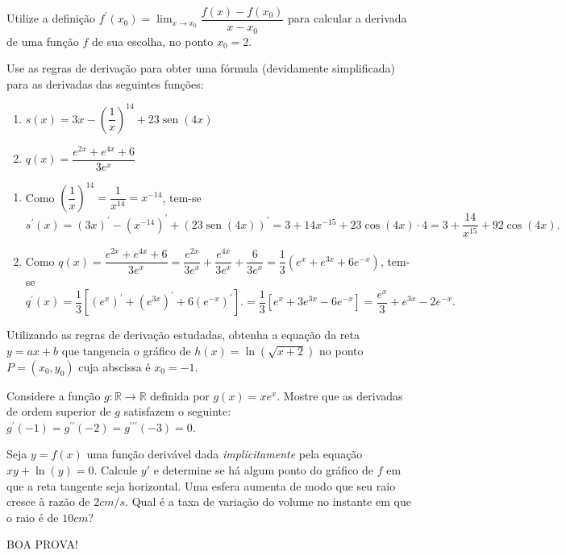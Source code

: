 \documentclass[12pt,a4paper]{article}
\newcommand{\fixme}{{\color{red}(...)}}
\newcommand*\sen{\operatorname{sen}}
\newcommand*\R{\mathbb{R}}
\begin{document}
\begin{ExerciseList}
\Exercise[title={2,0}]
Utilize a definição $\displaystyle f^\prime(x_0) = \lim_{x \to x_0} \dfrac{f(x) - f(x_0)}{x-x_0}$ para calcular a derivada de uma função $f$ de sua escolha, no ponto $x_0 = 2$.
\Answer \fixme

\Exercise[title={2,0}] Use as regras de derivação para obter uma fórmula (devidamente simplificada) para as derivadas das seguintes funções:
\begin{enumerate}
\item $s(x) = 3x - \left(\dfrac{1}{x}\right)^{14}+23\sen(4x)$
\item $q(x) = \dfrac{e^{2x}+e^{4x}+6}{3e^x}$
\end{enumerate}
\Answer
\begin{enumerate}
\item Como $\left(\dfrac{1}{x}\right)^{14} = \dfrac{1}{x^{14}} = x^{-14}$, tem-se
\[
s^\prime(x)
= (3x)^\prime - (x^{-14})^\prime + (23\sen(4x))^\prime
= 3 + 14x^{-15}+23 \cos(4x) \cdot 4
= 3 + \dfrac{14}{x^{15}} + 92\cos(4x).
\]
\item Como $q(x)
= \dfrac{e^{2x}+e^{4x}+6}{3e^x}
= \dfrac{e^{2x}}{3e^x} + \dfrac{e^{4x}}{3e^x} +\dfrac{6}{3e^x}
= \dfrac{1}{3}(e^{x}+e^{3x}+6e^{-x})
$, tem-se
\[
q^\prime(x)
= \dfrac{1}{3}\left[(e^{x})^\prime+(e^{3x})^\prime+6(e^{-x})^\prime\right].
= \dfrac{1}{3}\left[e^{x} + 3e^{3x} - 6e^{-x} \right]
= \dfrac{e^x}{3} + e^{3x} - 2e^{-x}.
\]
\end{enumerate}


\Exercise[title={2,0}] Utilizando as regras de derivação estudadas, obtenha a equação da reta $y = ax + b$ que tangencia o gráfico de $h(x) = \ln(\sqrt{x+2})$ no ponto $P = (x_0, y_0)$ cuja abscissa é $x_0 = -1$.
\Answer \fixme

\Exercise[title={2,0}] Considere a função $g: \R \to \R$ definida por $g(x) = x e^x$. Mostre que as derivadas de ordem superior de $g$ satisfazem o seguinte: $g^{\prime}(-1) = g^{\prime\prime}(-2) = g^{\prime\prime\prime}(-3) = 0$.
\Answer \fixme

\Exercise[title={2,0}] Seja $y = f(x)$ uma função derivável dada \textit{implicitamente} pela equação $xy + \ln(y) = 0$.
Calcule $y'$ e determine se há algum ponto do gráfico de $f$ em que a reta tangente seja horizontal.
\Answer \fixme
\Exercise[title={2,0}] Uma esfera aumenta de modo que seu raio cresce à razão de $2 cm/s$. Qual é a taxa de variação do volume no instante em que o raio é de $10cm$?
\Answer \fixme

\end{ExerciseList}

\begin{center}
BOA PROVA!
\end{center}

\end{document}
